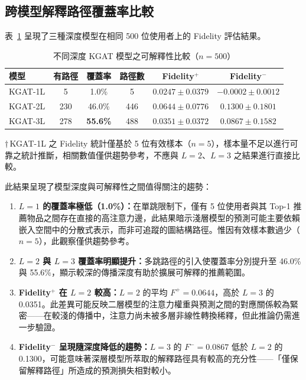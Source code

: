\subsection{跨模型解釋路徑覆蓋率比較}

表~\ref{tab:xai_depth_comparison} 呈現了三種深度模型在相同 500 位使用者上的 Fidelity 評估結果。

\begin{table}[htbp]
  \centering
  \caption{不同深度 KGAT 模型之可解釋性比較（$n = 500$）}
  \label{tab:xai_depth_comparison}
  \begin{tabular}{lccccc}
    \toprule
    模型 & 有路徑 & 覆蓋率 & 路徑數 & Fidelity$^+$ & Fidelity$^-$ \\
    \midrule
    KGAT-1L & 5 & 1.0\% & 5 & $0.0247 \pm 0.0379$ & $-0.0002 \pm 0.0012$ \\
    KGAT-2L & 230 & 46.0\% & 446 & $\bm{0.0644 \pm 0.0776}$ & $0.1300 \pm 0.1801$ \\
    KGAT-3L & 278 & \textbf{55.6\%} & 488 & $0.0351 \pm 0.0372$ & $0.0867 \pm 0.1582$ \\
    \bottomrule
  \end{tabular}
  \par\vspace{4pt}
  \begin{minipage}{0.9\linewidth}
    \footnotesize $\dagger$\,KGAT-1L 之 Fidelity 統計僅基於 5 位有效樣本（$n{=}5$），樣本量不足以進行可靠之統計推斷，相關數值僅供趨勢參考，不應與 $L{=}2$、$L{=}3$ 之結果進行直接比較。
  \end{minipage}
\end{table}

此結果呈現了模型深度與可解釋性之間值得關注的趨勢：

\begin{enumerate}[leftmargin=2em]
  \item \textbf{$L{=}1$ 的覆蓋率極低（1.0\%）：}在單跳限制下，僅有 5 位使用者與其 Top-1 推薦物品之間存在直接的高注意力邊，此結果暗示淺層模型的預測可能主要依賴嵌入空間中的分散式表示，而非可追蹤的圖結構路徑。惟因有效樣本數過少（$n{=}5$），此觀察僅供趨勢參考。
  \item \textbf{$L{=}2$ 與 $L{=}3$ 覆蓋率明顯提升：}多跳路徑的引入使覆蓋率分別提升至 46.0\% 與 55.6\%，顯示較深的傳播深度有助於擴展可解釋的推薦範圍。
  \item \textbf{Fidelity$^+$ 在 $L{=}2$ 較高：}$L{=}2$ 的平均 $F^+ = 0.0644$，高於 $L{=}3$ 的 0.0351。此差異可能反映二層模型的注意力權重與預測之間的對應關係較為緊密——在較淺的傳播中，注意力尚未被多層非線性轉換稀釋，但此推論仍需進一步驗證。
  \item \textbf{Fidelity$^-$ 呈現隨深度降低的趨勢：}$L{=}3$ 的 $F^- = 0.0867$ 低於 $L{=}2$ 的 0.1300，可能意味著深層模型所萃取的解釋路徑具有較高的充分性——「僅保留解釋路徑」所造成的預測損失相對較小。
\end{enumerate}

